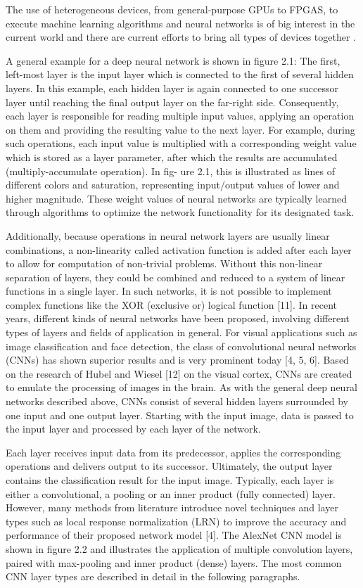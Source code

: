 The use of heterogeneous devices, from general-purpose GPUs to FPGAS, to execute 
machine learning algorithms and neural networks
is of big interest in the current world and there are current efforts to bring
all types of devices together \cite{abadi2016tensorflow}.



A general example for a deep neural network is
shown in figure 2.1: The first, left-most layer is the input layer which is connected to the
first of several hidden layers. In this example, each hidden layer is again connected to one
successor layer until reaching the final output layer on the far-right side. Consequently,
each layer is responsible for reading multiple input values, applying an operation on them
and providing the resulting value to the next layer. For example, during such operations,
each input value is multiplied with a corresponding weight value which is stored as a layer
parameter, after which the results are accumulated (multiply-accumulate operation). In fig-
ure 2.1, this is illustrated as lines of different colors and saturation, representing input/output
values of lower and higher magnitude. These weight values of neural networks are typically
learned through algorithms to optimize the network functionality for its designated task.

Additionally, because operations in neural network layers are usually linear combinations, a
non-linearity called activation function is added after each layer to allow for computation of
non-trivial problems. Without this non-linear separation of layers, they could be combined
and reduced to a system of linear functions in a single layer. In such networks, it is not
possible to implement complex functions like the XOR (exclusive or) logical function [11].
In recent years, different kinds of neural networks have been proposed, involving different
types of layers and fields of application in general. For visual applications such as image
classification and face detection, the class of convolutional neural networks (CNNs) has
shown superior results and is very prominent today [4, 5, 6]. Based on the research of
Hubel and Wiesel [12] on the visual cortex, CNNs are created to emulate the processing
of images in the brain. As with the general deep neural networks described above, CNNs
consist of several hidden layers surrounded by one input and one output layer. Starting with
the input image, data is passed to the input layer and processed by each layer of the network.

Each layer receives input data from its predecessor, applies the corresponding operations
and delivers output to its successor. Ultimately, the output layer contains the classification
result for the input image. Typically, each layer is either a convolutional, a pooling or an
inner product (fully connected) layer. However, many methods from literature introduce
novel techniques and layer types such as local response normalization (LRN) to improve the
accuracy and performance of their proposed network model [4]. The AlexNet CNN model
is shown in figure 2.2 and illustrates the application of multiple convolution layers, paired
with max-pooling and inner product (dense) layers. The most common CNN layer types are
described in detail in the following paragraphs.


